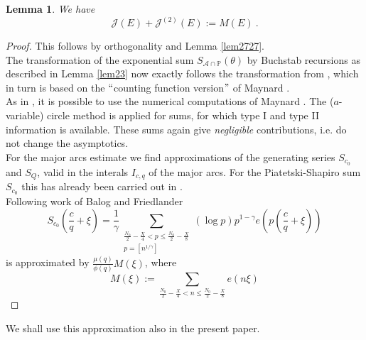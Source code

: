 \documentclass{amsart}
\newtheorem{lemma}[theorem]{Lemma}
\numberwithin{equation}{subsection}
\newtheorem{definition}[theorem]{Definition}
\begin{document}
\begin{lemma}\label{lem25}
We have
$$\mathcal{J}(E)+\mathcal{J}^{(2)}(E):=M(E)\:.$$
\end{lemma}
\begin{proof}
This follows by orthogonality and Lemma \ref{lem2727}.\\
The transformation of the exponential sum $S_{\mathcal{A}\cap \mathbb{P}}(\theta)$ by Buchstab recursions as described in Lemma \ref{lem23} now exactly follows the transformation from \cite{maier-rassias-gold}, which in turn is based on the $``$counting function version$"$ of Maynard \cite{maynard}.\\
As in \cite{maier-rassias-gold}, it is possible to use the numerical computations of Maynard \cite{maynard}. The ($a$-variable) circle method is applied for sums, for which type I and type II information is available. These sums again give \textit{negligible} contributions, i.e. do not change the asymptotics.\\
For the major arcs estimate we find approximations of the generating series $S_{c_0}$ and $S_Q$, valid in the interals $I_{c,q}$ of the major arcs. For the Piatetski-Shapiro sum $S_{c_0}$ this has already been carried out in \cite{maier-rassias-gold}.\\
Following work of Balog and Friedlander \cite{balog}
$$S_{c_0}\left(\frac{c}{q}+\xi\right)=\frac{1}{\gamma} \sum_{\substack{\frac{N_0}{2}-\frac{X}{4}<p\leq \frac{N_0}{2}-\frac{X}{8}\\ p=[n^{1/\gamma}]}} (\log p) p^{1-\gamma} e\left(p\left(\frac{c}{q}+\xi\right)\right)$$
is approximated by $\frac{\mu(q)}{\phi(q)}M(\xi)$, where
$$M(\xi):=\sum_{\frac{N_0}{2}-\frac{X}{4}<n\leq \frac{N_0}{2}-\frac{X}{8}} e(n\xi)$$
\end{proof}

We shall use this approximation also in the present paper.\\


%
\end{document}
